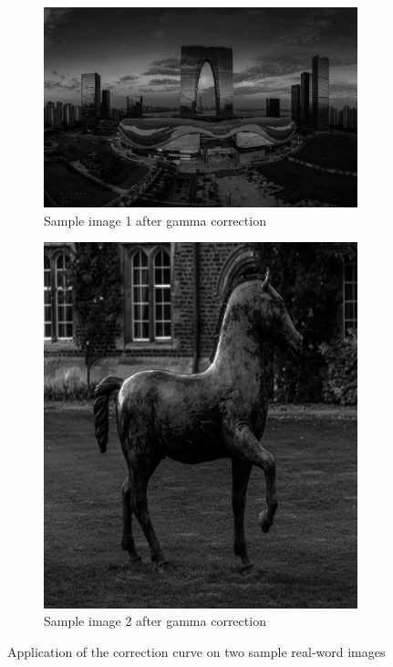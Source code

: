 \begin{figure}[H]
  \begin{subfigure}[t]{0.4\textwidth}
    \includegraphics[width=\textwidth]{szzx_grey_gamma_corrected.jpg}
    \caption{Sample image 1 after gamma correction}\label{fig:szzx_grey_gamma_corrected}
  \end{subfigure}
  \quad
  \begin{subfigure}[t]{0.219\textwidth}
    \includegraphics[width=\textwidth]{horse_grey_gamma_corrected.jpg}
    \caption{Sample image 2 after gamma correction}\label{fig:horse_grey_gamma_corrected}
  \end{subfigure}

  \caption{Application of the correction curve on two sample real-word images}
  \label{fig:Application of the correction curve on two sample real-word images}
\end{figure}

